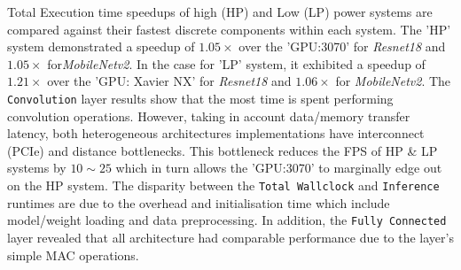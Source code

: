 

Total Execution time speedups of high (HP) and Low (LP) power systems are compared against their fastest discrete components within each system. The 'HP' system demonstrated a speedup of $1.05\times$ over the 'GPU:3070' for \textit{Resnet18} and $1.05\times$ for\textit{MobileNetv2}. In the case for 'LP' system, it exhibited a speedup of $1.21\times$ over the 'GPU: Xavier NX' for \textit{Resnet18} and $1.06\times$ for \textit{MobileNetv2}. The \texttt{Convolution} layer results show that the most time is spent performing convolution operations. However, taking in account data/memory transfer latency, both heterogeneous architectures implementations have interconnect (PCIe) and distance bottlenecks. This bottleneck reduces the FPS of HP \& LP systems by $10 \sim 25$ which in turn allows the 'GPU:3070' to marginally edge out on the HP system. The disparity between the \texttt{Total Wallclock} and \texttt{Inference} runtimes are due to the overhead and initialisation time which include model/weight loading and data preprocessing. In addition, the \texttt{Fully Connected} layer revealed that all architecture had comparable performance due to the layer's simple MAC operations.  

